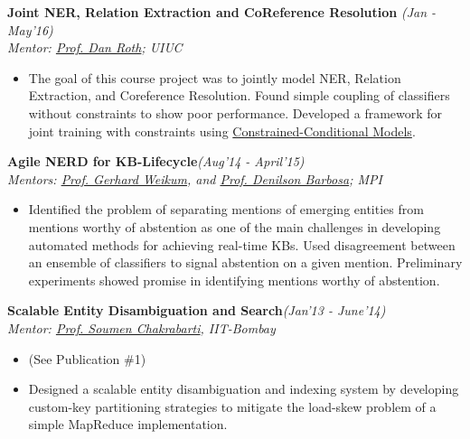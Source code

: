 \textsf{\textbf{Joint NER, Relation Extraction and CoReference Resolution}} \hfill\textit{\small(Jan - May'16)}
\\ {\textit{Mentor: \href{http://www.cis.upenn.edu/~danroth/}{Prof. Dan Roth}; UIUC}} \hfill{}
\normalsize
\begin{itemize}[leftmargin=*]\compresslist
\item[] The goal of this course project was to jointly model NER, Relation Extraction, and Coreference Resolution. Found simple coupling of classifiers without constraints to show poor performance. Developed a framework for joint training with constraints using \href{https://en.wikipedia.org/wiki/Constrained_conditional_model}{Constrained-Conditional Models}.
\end{itemize}

\newpage
\textsf{\textbf{Agile NERD for KB-Lifecycle}}\hfill\textit{\small(Aug'14 - April'15)}
\\ {\textit{Mentors: \href{https://people.mpi-inf.mpg.de/~weikum/}{Prof. Gerhard Weikum}, and \href{https://sites.ualberta.ca/~denilson/}{Prof. Denilson Barbosa}; MPI}}
\begin{itemize}[leftmargin=*]\compresslist
\item[] Identified the problem of separating mentions of emerging entities from mentions worthy of abstention as one of the main challenges in developing automated methods for achieving real-time KBs. Used disagreement between an ensemble of classifiers to signal abstention on a given mention. Preliminary experiments showed promise in identifying mentions worthy of abstention.
\end{itemize}

\textsf{\textbf{Scalable Entity Disambiguation and Search}}\hfill\textit{\small(Jan'13 - June'14)}
\\ {\textit{Mentor: \href{https://www.cse.iitb.ac.in/~soumen/}{Prof. Soumen Chakrabarti}, IIT-Bombay}}\hfill{}
\begin{itemize}[leftmargin=*]\compresslist
    \item[] (See Publication \#1)\vspace{-1mm}
    \item[] Designed a scalable entity disambiguation and indexing system by developing custom-key partitioning strategies to mitigate the load-skew problem of a simple MapReduce implementation. %
\end{itemize}

